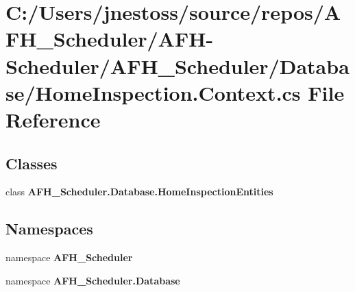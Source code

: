 \section{C\+:/\+Users/jnestoss/source/repos/\+A\+F\+H\+\_\+\+Scheduler/\+A\+F\+H-\/\+Scheduler/\+A\+F\+H\+\_\+\+Scheduler/\+Database/\+Home\+Inspection.Context.\+cs File Reference}
\label{_home_inspection_8_context_8cs}
\subsection*{Classes}
\begin{DoxyCompactItemize}
\item 
class \textbf{ A\+F\+H\+\_\+\+Scheduler.\+Database.\+Home\+Inspection\+Entities}
\end{DoxyCompactItemize}
\subsection*{Namespaces}
\begin{DoxyCompactItemize}
\item 
namespace \textbf{ A\+F\+H\+\_\+\+Scheduler}
\item 
namespace \textbf{ A\+F\+H\+\_\+\+Scheduler.\+Database}
\end{DoxyCompactItemize}
